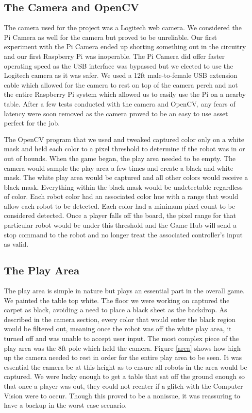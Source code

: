 \documentclass[11pt]{ieeeconf}
\begin{document}
\subsection{The Camera and OpenCV}

The camera used for the project was a Logitech web camera. We considered the Pi Camera as well for the camera but proved to be unreliable. Our first experiment with the Pi Camera ended up shorting something out in the circuitry and our first Raspberry Pi was inoperable. The Pi Camera did offer faster operating speed as the USB interface was bypassed but we elected to use the Logitech camera as it was safer. We used a 12ft male-to-female USB extension cable which allowed for the camera to rest on top of the camera perch and not the entire Raspberry Pi system which allowed us to easily use the Pi on a nearby table. After a few tests conducted with the camera and OpenCV, any fears of latency were soon removed as the camera proved to be an easy to use asset perfect for the job.  

The OpenCV program that we used and tweaked captured color only on a white mask and held each color to a pixel threshold to determine if the robot was in or out of bounds. When the game began, the play area needed to be empty. The camera would sample the play area a few times and create a black and white mask. The white play area would be captured and all other colors would receive a black mask. Everything within the black mask would be undetectable regardless of color. Each robot color had an associated color hue with a range that would allow each robot to be detected. Each color had a minimum pixel count to be considered detected. Once a player falls off the board, the pixel range for that particular robot would be under this threshold and the Game Hub will send a stop command to the robot and no longer treat the associated controller's input as valid. 

\subsection{The Play Area}

The play area is simple in nature but plays an essential part in the overall game. We painted the table top white. The floor we were working on captured the carpet as black, avoiding a need to place a black sheet as the backdrop. As described in the camera section, every color that would enter the black region would be filtered out, meaning once the robot was off the white play area, it turned off and was unable to accept user input. The most complex piece of the play area was the 8ft pole which held the camera. Figure \ref{area} shows how high up the camera needed to rest in order for the entire play area to be seen. It was essential the camera be at this height as to ensure all robots in the area would be captured. We were lucky enough to get a table that sat off the ground enough so that once a player was out, they could not reenter if a glitch with the Computer Vision were to occur. Though this proved to be a nonissue, it was reassuring to have a backup in the worst case scenario. 
\end{document}
